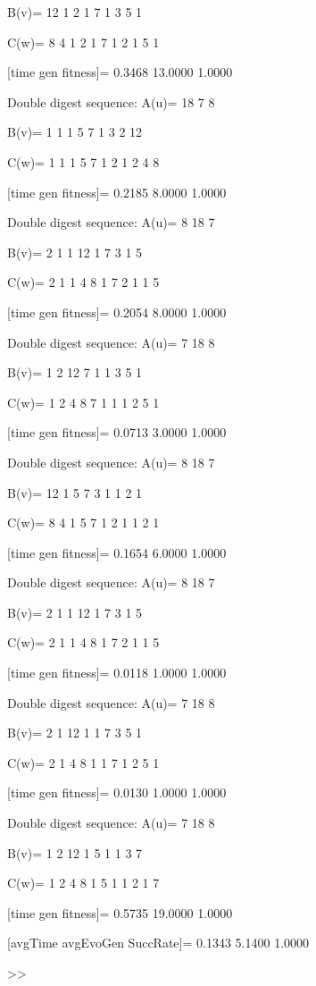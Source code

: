 B(v)=
    12     1     2     1     7     1     3     5     1

C(w)=
     8     4     1     2     1     7     1     2     1     5     1

[time gen fitness]=
    0.3468   13.0000    1.0000

Double digest sequence:
A(u)=
    18     7     8

B(v)=
     1     1     1     5     7     1     3     2    12

C(w)=
     1     1     1     5     7     1     2     1     2     4     8

[time gen fitness]=
    0.2185    8.0000    1.0000

Double digest sequence:
A(u)=
     8    18     7

B(v)=
     2     1     1    12     1     7     3     1     5

C(w)=
     2     1     1     4     8     1     7     2     1     1     5

[time gen fitness]=
    0.2054    8.0000    1.0000

Double digest sequence:
A(u)=
     7    18     8

B(v)=
     1     2    12     7     1     1     3     5     1

C(w)=
     1     2     4     8     7     1     1     1     2     5     1

[time gen fitness]=
    0.0713    3.0000    1.0000

Double digest sequence:
A(u)=
     8    18     7

B(v)=
    12     1     5     7     3     1     1     2     1

C(w)=
     8     4     1     5     7     1     2     1     1     2     1

[time gen fitness]=
    0.1654    6.0000    1.0000

Double digest sequence:
A(u)=
     8    18     7

B(v)=
     2     1     1    12     1     7     3     1     5

C(w)=
     2     1     1     4     8     1     7     2     1     1     5

[time gen fitness]=
    0.0118    1.0000    1.0000

Double digest sequence:
A(u)=
     7    18     8

B(v)=
     2     1    12     1     1     7     3     5     1

C(w)=
     2     1     4     8     1     1     7     1     2     5     1

[time gen fitness]=
    0.0130    1.0000    1.0000

Double digest sequence:
A(u)=
     7    18     8

B(v)=
     1     2    12     1     5     1     1     3     7

C(w)=
     1     2     4     8     1     5     1     1     2     1     7

[time gen fitness]=
    0.5735   19.0000    1.0000

[avgTime  avgEvoGen  SuccRate]=
    0.1343    5.1400    1.0000

>> 